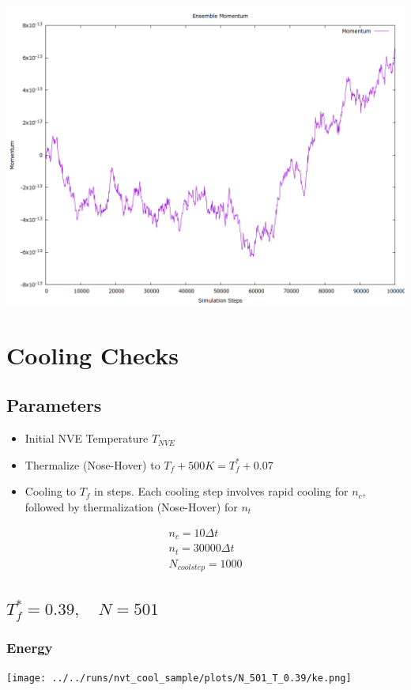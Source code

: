 \documentclass[a4paper,11pt,twoside]{article}
\begin{document}
\begin{center}
\includegraphics[width=.9\linewidth]{../../runs/nve_lammps_pair_style/plots/momentum.png}
\end{center}
\section{Cooling Checks}
\label{sec:org13ad751}
\subsection{Parameters}
\label{sec:org8b8a1c2}
\begin{itemize}
\item Initial NVE Temperature \(T_{NVE}\)
\item Thermalize (Nose-Hover) to \(T_f + 500K = T^*_f + 0.07\)
\item Cooling to \(T_f\) in steps. Each cooling step involves rapid cooling for \(n_c\), followed by thermalization (Nose-Hover) for \(n_t\)
\end{itemize}

\begin{align*}
n_c = 10\Delta t \\
n_t = 30000\Delta t \\
N_{cool step} = 1000
\end{align*}
\subsection{\(T^*_f = 0.39, \quad N = 501\)}
\label{sec:orgf036cd5}
\subsubsection{Energy}
\label{sec:orga3d3361}
\begin{center}
\texttt{[image: ../../runs/nvt\_cool\_sample/plots/N\_501\_T\_0.39/ke.png]}
\end{center}
\end{document}
